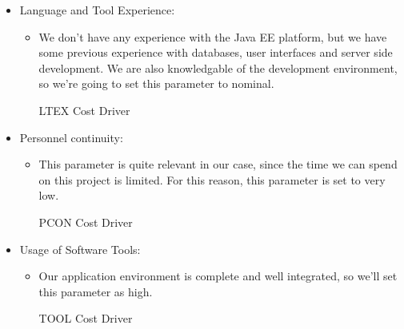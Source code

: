 \begin{itemize}
	\item Language and Tool Experience: 
	\begin{itemize}
	\item[] We don't have any experience with the Java EE platform, but we have some previous experience with databases, user interfaces and server side development. We are also knowledgable of the development environment, so we're going to set this parameter to nominal.
	\begin{costdriverstable}{LTEX Cost Driver}
		\hline
	\end{costdriverstable}
	\end{itemize}
\end{itemize}

\begin{itemize}
	\item Personnel continuity: 
	\begin{itemize}
	\item[] This parameter is quite relevant in our case, since the time we can spend on this project is limited. For this reason, this parameter is set to very low. 
	\begin{costdriverstable}{PCON Cost Driver}
		\hline	
	\end{costdriverstable}
	\end{itemize}
\end{itemize}

\begin{itemize}
	\item Usage of Software Tools: 
	\begin{itemize}
	\item[] Our application environment is complete and well integrated, so we'll set this parameter as high. 
	\begin{costdriverstable}{TOOL Cost Driver}
		\hline
	\end{costdriverstable}
	\end{itemize}
\end{itemize}

